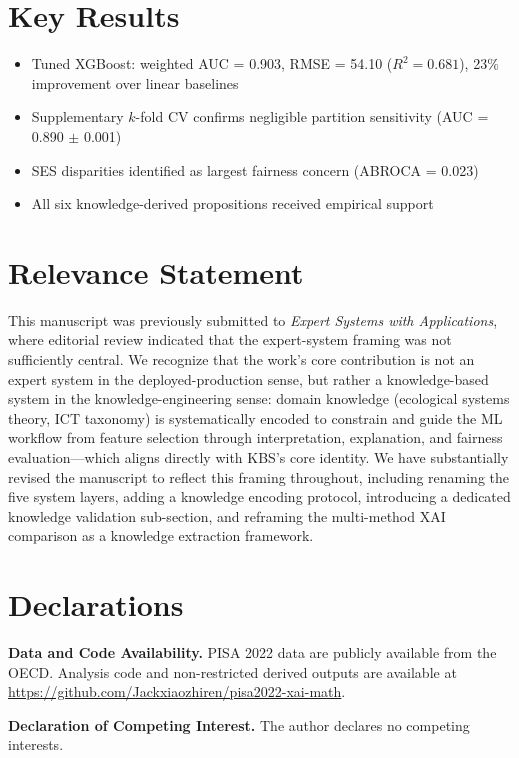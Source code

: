 \documentclass[12pt]{article}
\begin{document}
\section*{Key Results}

\begin{itemize}
\item Tuned XGBoost: weighted AUC = 0.903, RMSE = 54.10 ($R^2 = 0.681$), 23\% improvement over linear baselines
\item Supplementary $k$-fold CV confirms negligible partition sensitivity (AUC = 0.890 $\pm$ 0.001)
\item SES disparities identified as largest fairness concern (ABROCA = 0.023)
\item All six knowledge-derived propositions received empirical support
\end{itemize}

\section*{Relevance Statement}

This manuscript was previously submitted to \textit{Expert Systems with Applications}, where editorial review indicated that the expert-system framing was not sufficiently central. We recognize that the work's core contribution is not an expert system in the deployed-production sense, but rather a knowledge-based system in the knowledge-engineering sense: domain knowledge (ecological systems theory, ICT taxonomy) is systematically encoded to constrain and guide the ML workflow from feature selection through interpretation, explanation, and fairness evaluation---which aligns directly with KBS's core identity. We have substantially revised the manuscript to reflect this framing throughout, including renaming the five system layers, adding a knowledge encoding protocol, introducing a dedicated knowledge validation sub-section, and reframing the multi-method XAI comparison as a knowledge extraction framework.

\section*{Declarations}

\textbf{Data and Code Availability.} PISA 2022 data are publicly available from the OECD. Analysis code and non-restricted derived outputs are available at \url{https://github.com/Jackxiaozhiren/pisa2022-xai-math}.

\textbf{Declaration of Competing Interest.} The author declares no competing interests.
\end{document}
